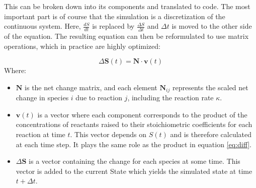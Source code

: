 This can be broken down into its components and translated to code. The most important part is of course that the simulation is a discretization of the continuous system. Here, $\frac{dS}{dt}$ is replaced by $\frac{\Delta S}{\Delta t}$ and $\Delta t$ is moved to the other side of the equation. The resulting equation can then be reformulated to use matrix operations, which in practice are highly optimized:

\[
\Delta \mathbf{S}(t) = \mathbf{N} \cdot \mathbf{v}(t)
\]
Where:
\begin{itemize}
    \item \( \mathbf{N} \) is the net change matrix, and each element \( \mathbf{N}_{ij} \) represents the scaled net change in species \( i \) due to reaction \( j \), including the reaction rate \( \kappa \). 


    \item \( \mathbf{v}(t) \) is a vector where each component corresponds to the product of the concentrations of reactants raised to their stoichiometric coefficients for each reaction at time \( t \). This vector depends on $S(t)$ and is therefore calculated at each time step. It plays the same role as the product in equation \ref{eq:diff}. 
    \item $\Delta \mathbf{S}$ is a vector containing the change for each species at some time. This vector is added to the current State which yields the simulated state at time $t+\Delta t$. 
\end{itemize}

